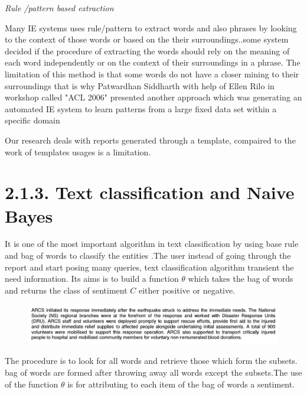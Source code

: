 \textit{Rule /pattern based extraction}

Many IE systems uses rule/pattern to extract words and also phrases by looking to the context of those words or based on the their surroundings.\citep{califf2003bottom}.some system decided if the procedure of extracting the words should rely on the meaning of each word independently or on the context of their surroundings in a phrase.
The limitation of this method is that some words do not have a closer mining to their surroundings that is why Patwardhan Siddharth with help of Ellen Rilo  in workshop called "ACL 2006" presented another approach which  was  generating an automated IE system to learn patterns from a large fixed data set  within a specific domain \citep{patwardhan2007effective} 

Our research deals with reports generated through a template, compaired to the work of  \citep{patwardhan2007effective} templates usages is a limitation.





\section*{2.1.3. Text classification and Naive Bayes}
It is one of the most important algorithm in text classification by using base rule and bag of words to classify the entities \citep{manning2012information}.The user instead of going through the report and start posing many queries, text classification algorithm transient the need information.
Its aims is to build a function $\theta$ which takes the bag of words and returns the class of sentiment $C$ either positive or negative.

{ \centering{$\theta$}

\centering{$\Updownarrow$}   

\begin{figure}[hbtp]
\centering
\includegraphics[scale=0.4]{images/report.png}
\end{figure}

{\centering{$\Updownarrow$}}

{}

The procedure is to look for all words and retrieve those which form the subsets.  bag of words are formed after throwing away  all words except the subsets.The use of the function $\theta$  is for  attributing  to each item of the bag of words a sentiment.}

